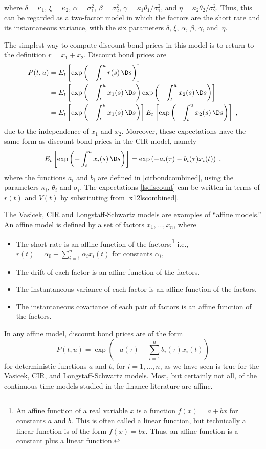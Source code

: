 where $\delta=\kappa_1$, $\xi=\kappa_2$, $\alpha = \sigma_1^2$, $\beta=\sigma_2^2$, $\gamma = \kappa_1\theta_1/\sigma_1^2$, and $\eta = \kappa_2\theta_2/\sigma_2^2$.  Thus, this can be regarded as a two-factor model in which the factors are the short rate and its instantaneous variance, with the six parameters $\delta$, $\xi$, $\alpha$, $\beta$, $\gamma$, and~$\eta$.

The simplest way to compute discount bond prices in this model is to return to the definition $r=x_1+x_2$.  Discount bond prices are
\begin{align*}
P(t,u) &= E_t\left[\exp\left(-\int_t^u r(s)\,\D s\right)\right]\\
&= E_t\left[\exp\left(-\int_t^u x_1(s)\,\D s\right)\exp\left(-\int_t^u x_2(s)\,\D s\right)\right]\\
&= E_t\left[\exp\left(-\int_t^u x_1(s)\,\D s\right)\right] E_t\left[\exp\left(-\int_t^u x_2(s)\,\D s\right)\right]\;,
\end{align*}
due to the independence of $x_1$ and $x_2$.  Moreover, these expectations have the same form as discount bond prices in the CIR model, namely
\begin{equation}\label{lsdiscount}
E_t\left[\exp\left(-\int_t^u x_i(s)\,\D s\right)\right] = \exp\left(-a_i(\tau)-b_i(\tau)x_i(t)\right)\;,
\end{equation}
where the functions $a_i$ and $b_i$ are defined in \eqref{cirbondcombined}, using the parameters $\kappa_i$, $\theta_i$ and $\sigma_i$.
The expectations \eqref{lsdiscount} can be written in terms of $r(t)$ and $V(t)$ by substituting from \eqref{x12lscombined}.

The Vasicek, CIR and Longstaff-Schwartz models are examples of ``affine models.''  An affine model is defined by a set of factors $x_1, \ldots, x_n$, where 
\begin{itemize}
\item The short rate is an affine function of the factors;\footnote{An affine function of a real variable $x$ is a function $f(x) = a + bx$ for constants $a$ and $b$.  This is often called a linear function, but technically a linear function is of the form $f(x)=bx$.  Thus, an affine function is a constant plus a linear function.} i.e., $r(t) = \alpha_0 + \sum_{i=1}^n \alpha_ix_i(t)$ for constants $\alpha_i$, 
\item The drift of each factor is an affine function of the factors.
\item The instantaneous variance of each factor is an affine function of the factors.
\item The instantaneous covariance of each pair of factors is an affine function of the factors.
\end{itemize}
In any affine model, discount bond prices are of the form
\begin{equation}\label{affine}
P(t,u) = \exp\left(-a(\tau)-\sum_{i=1}^n b_i(\tau)x_i(t)\right)
\end{equation}
for deterministic functions $a$ and $b_i$ for $i=1,\ldots,n$, as we have seen is true for the Vasicek, CIR, and Longstaff-Schwartz models.  Most, but certainly not all, of the continuous-time models studied in the finance literature are affine.


